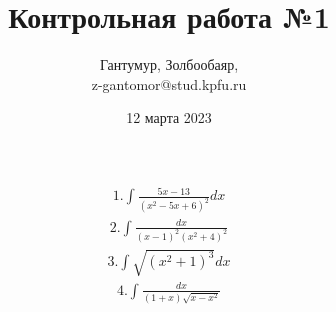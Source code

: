 \documentclass{article}
\author{
	Гантумур, Золбообаяр,\\
	z-gantomor@stud.kpfu.ru
}
\title{Контрольная работа №1}
\date{12 марта 2023}
\begin{document}
	\maketitle
	\begin{align}
	1. \int \frac{5x-13}{(x^2-5x+6)^2} dx
	\end{align}
	\begin{align}
	2. \int \frac{dx}{(x-1)^2(x^2+4)^2}
	\end{align}
	\begin{align}
	3. \int \sqrt{(x^2+1)^3} dx
	\end{align}
	\begin{align}
	4. \int \frac{dx}{(1+x)\sqrt{x-x^2}}
	\end{align}
\end{document}
